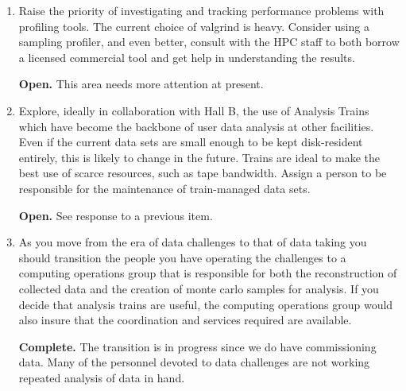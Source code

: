 \documentclass[12pt]{article}
\begin{document}
\begin{enumerate}
  {\bf Open.} Planning is in early stages still.

\item Raise the priority of investigating and tracking performance
  problems with profiling tools. The current choice of valgrind is
  heavy. Consider using a sampling profiler, and even better, consult
  with the HPC staff to both borrow a licensed commercial tool and get
  help in understanding the results.

  {\bf Open.} This area needs more attention at present.

\item Explore, ideally in collaboration with Hall B, the use of
  Analysis Trains which have become the backbone of user data analysis
  at other facilities. Even if the current data sets are small enough
  to be kept disk-resident entirely, this is likely to change in the
  future. Trains are ideal to make the best use of scarce resources,
  such as tape bandwidth. Assign a person to be responsible for the
  maintenance of train-managed data sets.

  {\bf Open.} See response to a previous item.

\item As you move from the era of data challenges to that of data
  taking you should transition the people you have operating the
  challenges to a computing operations group that is responsible for
  both the reconstruction of collected data and the creation of monte
  carlo samples for analysis. If you decide that analysis trains are
  useful, the computing operations group would also insure that the
  coordination and services required are available.

  {\bf Complete.} The transition is in progress since we do have
  commissioning data. Many of the personnel devoted to data challenges
  are not working repeated analysis of data in hand.

\end{enumerate}
\end{document}
